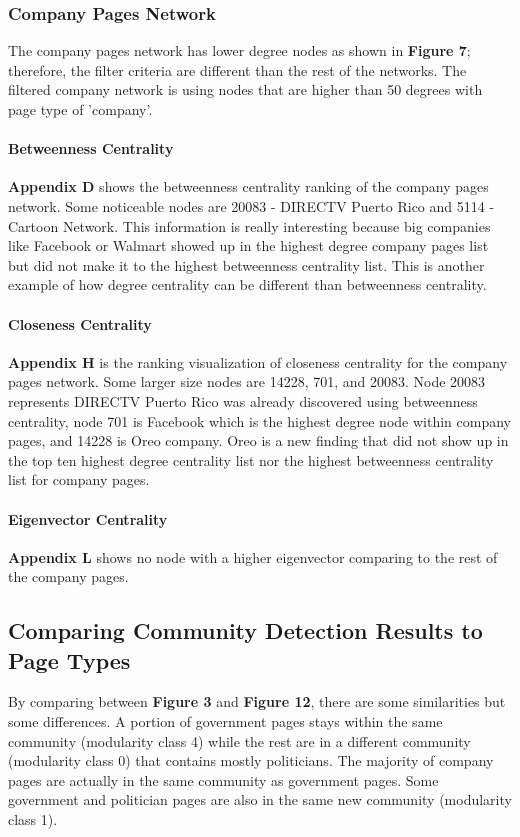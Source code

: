 \documentclass[11pt,twocolumn]{article}
\begin{document}
\subsubsection{Company Pages Network}
The company pages network has lower degree nodes as shown in \textbf{Figure 7}; therefore, the filter criteria are different than the rest of the networks. The filtered company network is using nodes that are higher than 50 degrees with page type of 'company'.
\paragraph{Betweenness Centrality}
\textbf{Appendix D} shows the betweenness centrality ranking of the company pages network. Some noticeable nodes are 20083 - DIRECTV Puerto Rico and 5114 - Cartoon Network. This information is really interesting because big companies like Facebook or Walmart showed up in the highest degree company pages list but did not make it to the highest betweenness centrality list. This is another example of how degree centrality can be different than betweenness centrality.

\paragraph{Closeness Centrality}
\textbf{Appendix H} is the ranking visualization of closeness centrality for the company pages network. Some larger size nodes are 14228, 701, and 20083. Node 20083 represents DIRECTV Puerto Rico was already discovered using betweenness centrality, node 701 is Facebook which is the highest degree node within company pages, and 14228 is Oreo company. Oreo is a new finding that did not show up in the top ten highest degree centrality list nor the highest betweenness centrality list for company pages.

\paragraph{Eigenvector Centrality}
\textbf{Appendix L} shows no node with a higher eigenvector comparing to the rest of the company pages. 

\subsection{Comparing Community Detection Results to Page Types}
By comparing between \textbf{Figure 3} and \textbf{Figure 12}, there are some similarities but some differences. A portion of government pages stays within the same community (modularity class 4) while the rest are in a different community (modularity class 0) that contains mostly politicians. The majority of company pages are actually in the same community as government pages. Some government and politician pages are also in the same new community (modularity class 1).      
\end{document}
